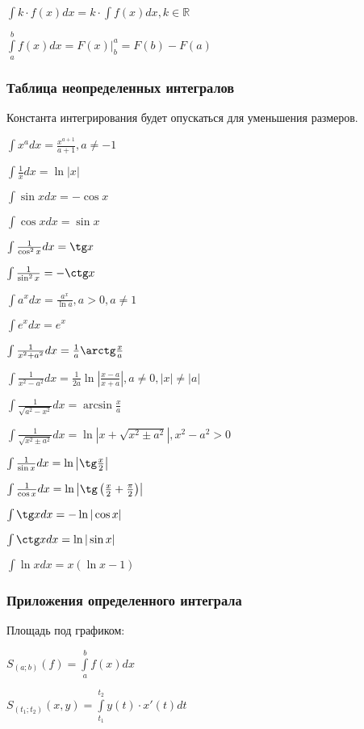 $ \int k\cdot f(x) dx = k\cdot \int f(x) dx, k \in \mathbb{R} $

$ \int\limits_a^b f(x) dx = \left.F(x)\right|_b^a = F(b) - F(a) $

\subsubsection{Таблица неопределенных интегралов}

Константа интегрирования будет опускаться для уменьшения размеров.

$ \int x^a dx = \frac{x^{a+1}}{a+1}, a \neq -1 $

$ \int \frac{1}{x} dx = \ln|x| $

$ \int \sin x dx = -\cos x $

$ \int \cos x dx = \sin x $

$ \int \frac{1}{\cos^2 x} dx = \tg x $

$ \int \frac{1}{\sin^2 x} = -\ctg x $

$ \int a^x dx = \frac{a^x}{\ln a}, a>0, a \neq 1 $

$ \int e^x dx = e^x $

$ \int \frac{1}{x^2 + a^2} dx = \frac{1}{a} \arctg\frac{x}{a} $

$ \int \frac{1}{x^2 - a^2} dx = \frac{1}{2a} \ln\left|\frac{x-a}{x+a}\right|, a \neq 0, |x| \neq |a| $

$ \int \frac{1}{\sqrt{a^2-x^2}} dx = \arcsin\frac{x}{a} $

$ \int \frac{1}{\sqrt{x^2\pm a^2}} dx = \ln\left|x+\sqrt{x^2\pm a^2}\right|, x^2-a^2 > 0 $

$ \int \frac{1}{\sin x} dx = \ln\left|\tg\frac{x}{2}\right| $

$ \int \frac{1}{\cos x} dx = \ln\left|\tg\left(\frac{x}{2} + \frac{\pi}{2}\right)\right| $

$ \int \tg x dx = -\ln|\cos x| $

$ \int \ctg x dx = \ln|\sin x| $

$ \int \ln x dx = x(\ln x -1) $

\subsubsection{Приложения определенного интеграла}

Площадь под графиком:

$ S_{(a; b)}(f) = \int\limits_a^b f(x) dx $

$ S_{(t_1; t_2)}(x, y) = \int\limits_{t_1}^{t_2} y(t)\cdot x'(t) dt $ 

